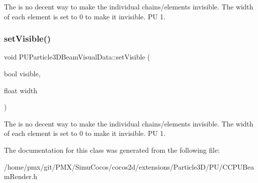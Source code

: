 The is no decent way to make the individual chains/elements invisible. The width of each element is set to 0 to make it invisible. PU 1. \mbox{\label{classPUParticle3DBeamVisualData_ac26dcb281e318cd880865290b373f88c}} 
\subsubsection{\texorpdfstring{set\+Visible()}{setVisible()}\hspace{0.1cm}{\footnotesize\ttfamily [2/2]}}
{\footnotesize\ttfamily void P\+U\+Particle3\+D\+Beam\+Visual\+Data\+::set\+Visible (\begin{DoxyParamCaption}\item[{bool}]{visible,  }\item[{float}]{width }\end{DoxyParamCaption})\hspace{0.3cm}{\ttfamily [inline]}}

The is no decent way to make the individual chains/elements invisible. The width of each element is set to 0 to make it invisible. PU 1. 

The documentation for this class was generated from the following file\+:\begin{DoxyCompactItemize}
\item 
/home/pmx/git/\+P\+M\+X/\+Simu\+Cocos/cocos2d/extensions/\+Particle3\+D/\+P\+U/C\+C\+P\+U\+Beam\+Render.\+h\end{DoxyCompactItemize}

